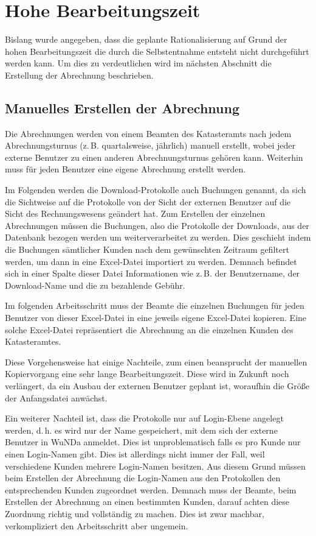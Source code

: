 \section{Hohe Bearbeitungszeit}

Bislang wurde angegeben, dass die geplante Rationalisierung auf Grund der hohen Bearbeitungszeit die durch die Selbstentnahme entsteht nicht durchgeführt werden kann. Um dies zu verdeutlichen wird im nächsten Abschnitt die Erstellung der Abrechnung beschrieben. 

\subsection{Manuelles Erstellen der Abrechnung}
Die Abrechnungen werden von einem Beamten des Katasteramts nach jedem Abrechnungsturnus (z.\,B. quartalsweise, jährlich) manuell erstellt, wobei jeder externe Benutzer zu einen anderen Abrechnungsturnus gehören kann.
Weiterhin muss für jeden Benutzer eine eigene Abrechnung erstellt werden.

Im Folgenden werden die Download-Protokolle auch Buchungen genannt, da sich die Sichtweise auf die Protokolle von der Sicht der externen Benutzer auf die Sicht des Rechnungswesens geändert hat.
Zum Erstellen der einzelnen Abrechnungen müssen die Buchungen, also die Protokolle der Downloads, aus der Datenbank bezogen werden um weiterverarbeitet zu werden.
Dies geschieht indem die Buchungen sämtlicher Kunden nach dem gewünschten Zeitraum gefiltert werden, um dann in eine Excel-Datei importiert zu werden.
Demnach befindet sich in einer Spalte dieser Datei Informationen wie z.\,B. der Benutzername, der Download-Name und die zu bezahlende Gebühr.

Im folgenden Arbeitsschritt muss der Beamte die einzelnen Buchungen für jeden Benutzer von dieser Excel-Datei in eine jeweils eigene Excel-Datei kopieren. Eine solche Excel-Datei repräsentiert die Abrechnung an die einzelnen Kunden des Katasteramtes.

Diese Vorgehensweise hat einige Nachteile, zum einen beansprucht der manuellen Kopiervorgang eine sehr lange Bearbeitungszeit. Diese wird in Zukunft noch verlängert, da ein Ausbau der externen Benutzer geplant ist, woraufhin die Größe der Anfangsdatei anwächst.

Ein weiterer Nachteil ist, dass die Protokolle nur auf Login-Ebene angelegt werden, d.\,h. es wird nur der Name gespeichert, mit dem sich der externe Benutzer in \ac{WuNDa} anmeldet.
Dies ist unproblematisch falls es pro Kunde nur einen Login-Namen gibt.
Dies ist allerdings nicht immer der Fall, weil verschiedene Kunden mehrere Login-Namen besitzen.
Aus diesem Grund müssen beim Erstellen der Abrechnung die Login-Namen aus den Protokollen den entsprechenden Kunden zugeordnet werden.
Demnach muss der Beamte, beim Erstellen der Abrechnung an einen bestimmten Kunden, darauf achten diese Zuordnung richtig und vollständig zu machen.
Dies ist zwar machbar, verkompliziert den Arbeitsschritt aber ungemein.

